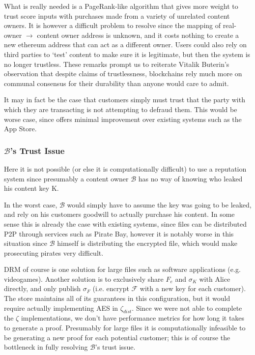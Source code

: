 \documentclass[12pt,oneside]{amsart}
\makeatletter
\def\file{\mathcal{F}}
\def\bob{\mathcal{B}}
\def\zksnark{\zeta}
\newcommand*\ie{i.e.\@\xspace}
\makeatother
\begin{document}
\begin{multicols}{2}
What is really needed is a PageRank-like algorithm that gives more weight to trust score inputs with purchases made from a variety of unrelated content owners.
It is however a difficult problem to resolve since the mapping of real-owner $\rightarrow$ content owner address is unknown, and it costs nothing to create a new ethereum address that can act as a different owner.
Users could also rely on third parties to `test' content to make sure it is legitimate, but then the system is no longer trustless.
These remarks prompt us to reiterate Vitalik Buterin's observation that despite claims of trustlessness, blockchains rely much more on communal consensus for their durability than anyone would care to admit.

It may in fact be the case that customers simply must trust that the party with which they are transacting is not attempting to defraud them.
This would be worse case, since offers minimal improvement over existing systems such as the App Store.

\subsubsection{$\bob$'s Trust Issue}
Here it is not possible (or else it is computationally difficult) to use a reputation system since presumably a content owner $\bob$ has no way of knowing who leaked his content key K.

In the worst case, $\bob$ would simply have to assume the key was going to be leaked, and rely on his customers goodwill to actually purchase his content.
In some sense this is already the case with existing systems, since files can be distributed P2P through services such as Pirate Bay, however it is notably worse in this situation since $\bob$ himself is distributing the encrypted file, which would make prosecuting pirates very difficult.

DRM of course is one solution for large files such as software applications (e.g. videogames).
Another solution is to exclusively share $F_e$ and $\sigma_K$ with Alice directly, and only publish $\sigma_F$ (\ie encrypt $\file$ with a new key for each customer).
The store maintains all of its guarantees in this configuration, but it would require actually implementing AES in $\zksnark_{dist}$.
Since we were not able to complete the $\zksnark$ implementations, we don't have performance metrics for how long it takes to generate a proof.
Presumably for large files it is computationally infeasible to be generating a new proof for each potential customer; this is of course the bottleneck in fully resolving $\bob$'s trust issue.


\end{multicols}
\end{document}
